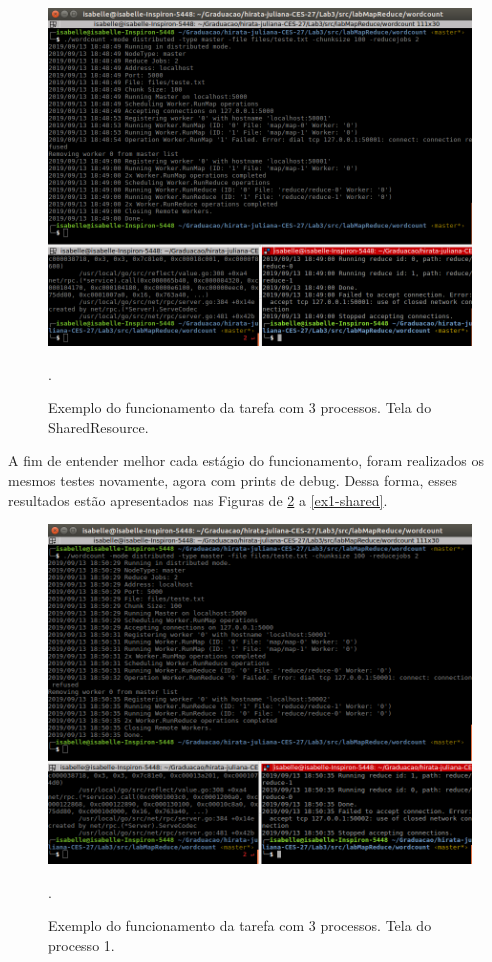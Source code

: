 \documentclass[conference]{IEEEtran}
\begin{document}
\begin{figure}[H]
\centering
\centerline{\includegraphics[scale=0.5]{imagens/tarefa_2_3_map/tarefa_2_3_map.png}}
\caption{Exemplo do funcionamento da tarefa com 3 processos. Tela do SharedResource.}.
\label{ex1-shared-clean}
\end{figure}
	
	A fim de entender melhor cada estágio do funcionamento, foram realizados os mesmos testes novamente, agora com prints de debug. Dessa forma, esses resultados estão apresentados nas Figuras de \ref{ex1-proc1} a \ref{ex1-shared}.
	
\begin{figure}[H]
\centering
\centerline{\includegraphics[scale=0.5]{imagens/tarefa_2_3_reduce/tarefa_2_3_reduce.png}}
\caption{Exemplo do funcionamento da tarefa com 3 processos. Tela do processo 1.}.
\label{ex1-proc1}
\end{figure}
\end{document}
